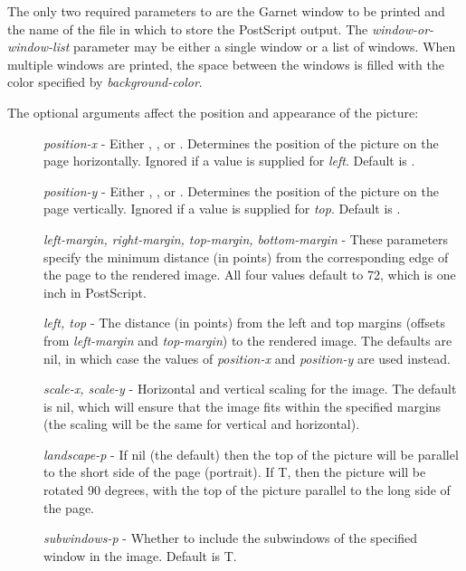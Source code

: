 The only two required parameters to  are the Garnet window
to be printed and the name of the file in which to store the PostScript
output.  The {\it window-or-window-list} parameter may be either a single window
or a list of
windows.  When multiple windows are printed, the space between the windows is
filled with the color specified by {\it background-color}.

The optional arguments affect the position and appearance of the
picture:

\begin{description}
\item[] {\it position-x} - Either , , or .
Determines the position of the picture on the page horizontally.
Ignored if a value is supplied for {\it left}.  Default is .

\item[] {\it position-y} - Either , , or .
Determines the position of the picture on the page vertically.
Ignored if a value is supplied for {\it top}.  Default is .

\item[] {\it left-margin, right-margin, top-margin, bottom-margin} - These parameters
specify the minimum distance (in points) from the corresponding edge of the
page to the rendered image.  All four values default to 72,
which is one inch in PostScript.

\item[] {\it left, top} - The distance (in points) from the left and top margins
(offsets from {\it left-margin} and {\it top-margin}) to
the rendered image.  The defaults are {\sc nil}, in which
case the values of {\it position-x} and {\it position-y} are used instead.

\item[] {\it scale-x, scale-y} - Horizontal and vertical scaling for the image.  The
default is {\sc nil}, which will ensure that the image fits within the specified
margins (the scaling will be the same for vertical and horizontal).

\item[] {\it landscape-p} - If {\sc nil} (the default) then the top of the picture will be
parallel to the short side of the page (portrait).
If T, then the picture will be rotated 90 degrees, with the top of the picture
parallel to the long side of the page.

\item[] {\it subwindows-p} - Whether to include the subwindows of the specified window
in the image.  Default is T.


\end{description}
